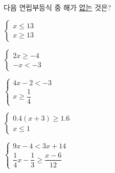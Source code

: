 다음 연립부등식 중 해가 \underline{없는} 것은?
\begin{choicesii}{\rule[-3ex]{0pt}{8ex}$\begin{cases} x\le 13 \\ x\ge 13 \end{cases}$}{\rule[-3ex]{0pt}{8ex}$\begin{cases} 2x\ge -4 \\ -x<-3 \end{cases}$}{\rule[-3ex]{0pt}{8ex}$\begin{cases} 4x-2<-3 \\ x\ge \dfrac{1}{4} \end{cases}$}{\rule[-3ex]{0pt}{8ex}$\begin{cases} 0.4(x+3)\ge 1.6 \\ x\le 1 \end{cases}$}{\rule[-3ex]{0pt}{8ex}$\begin{cases} 9x-4<3x+14 \\ \dfrac{1}{4}x-\dfrac{1}{3}\ge \dfrac{x-6}{12} \end{cases}$}\end{choicesii}
